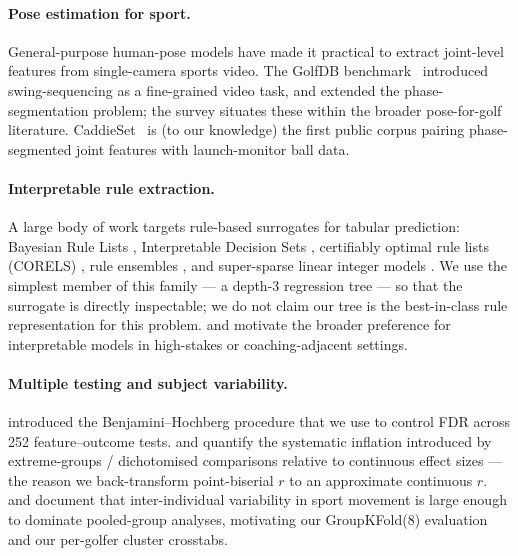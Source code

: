 \documentclass[11pt,a4paper]{article}
\begin{document}
\paragraph{Pose estimation for sport.}
General-purpose human-pose models \citep{cao2019openpose,sun2019hrnet,xu2022vitpose} have made it practical to
extract joint-level features from single-camera sports video.  The GolfDB benchmark~\citep{mcnally2019golfdb}
introduced swing-sequencing as a fine-grained video task, and \citet{liao2022maniflow} extended the
phase-segmentation problem; the \citet{ke2023golfpose} survey situates these within the broader pose-for-golf
literature.  CaddieSet~\citep{jung2025caddieset} is (to our knowledge) the first public corpus pairing
phase-segmented joint features with launch-monitor ball data.

\paragraph{Interpretable rule extraction.}
A large body of work targets rule-based surrogates for tabular prediction: Bayesian Rule Lists
\citep{letham2015rules}, Interpretable Decision Sets \citep{lakkaraju2016interpretable}, certifiably optimal
rule lists (\textsc{CORELS}) \citep{angelino2017corels}, rule ensembles \citep{friedman2008rulefit}, and
super-sparse linear integer models \citep{ustun2016slim}.  We use the simplest member of this family --- a
depth-3 regression tree --- so that the surrogate is directly inspectable; we do not claim our tree is the
best-in-class rule representation for this problem.  \citet{rudin2019stop} and
\citet{doshivelez2017interpretability} motivate the broader preference for interpretable models in
high-stakes or coaching-adjacent settings.

\paragraph{Multiple testing and subject variability.}
\citet{benjamini1995controlling} introduced the Benjamini--Hochberg procedure that we use to control FDR across
252 feature--outcome tests.  \citet{fitzsimons2008correction} and \citet{cohen1983dichotomization} quantify the
systematic inflation introduced by extreme-groups / dichotomised comparisons relative to continuous effect
sizes --- the reason we back-transform point-biserial $r$ to an approximate continuous $r$.
\citet{bartlett2006subject} and \citet{button2003coordination} document that inter-individual variability in
sport movement is large enough to dominate pooled-group analyses, motivating our GroupKFold(8) evaluation and
our per-golfer cluster crosstabs.
\end{document}
